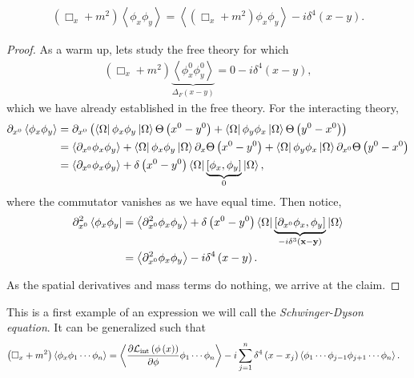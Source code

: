 \begin{claim}
    \begin{align}
        \left( \Box_x + m^2 \right) \left<\phi_x \phi_y \right> = \left< \left( \Box_x + m^2 \right) \phi_x \phi_y \right> - i \delta^{4} \left(  x- y \right) 
    .\end{align}
\end{claim}

\begin{proof}
    As a warm up, lets study the free theory for which
    \begin{align}
        \left( \Box_x + m^2 \right) \underbrace{\left<\phi_x^{0} \phi_y^{0} \right>}_{\Delta_F \left( x- y \right) } = 0 - i \delta^{4}\left( x-y \right) 
    ,\end{align}
    which we have already established in the free theory. For the interacting theory,
    \begin{align}
        \partial_{x^0} \left< \phi_x \phi_y \right> &= \partial_{x^0} \left( \bra{\Omega} \phi_x \phi_y \ket{\Omega} \Theta \left( x^{0} - y^{0} \right) + \bra{\Omega} \phi_y \phi_x \ket{\Omega} \Theta \left( y^{0} - x^{0} \right)  \right)  \\
        &= \left<\partial_{x^{0}} \phi_x \phi_y \right> + \bra{\Omega} \phi_x \phi_y \ket{\Omega} \partial_x \Theta \left( x^{0} - y^{0} \right)  + \bra{\Omega} \phi_y \phi_x \ket{\Omega} \partial_{x^{0}} \Theta \left( y^{0} - x^{0} \right)  \\
        &= \left< \partial_{x^{0}} \phi_x \phi_y \right> + \delta \left( x^{0} - y^{0} \right) \bra{\Omega} \underbrace{\left[ \phi_x, \phi_y \right]}_{0} \ket{\Omega}
    ,\end{align}
    where the commutator vanishes as we have equal time.
    Then notice,
    \begin{align}
        \partial_{x^{0}}^2 \bra{\phi_x \phi_y} &= \left<\partial_{x^{0}}^2 \phi_x \phi_y \right> + \delta \left( x^{0} - y^{0} \right) \bra{\Omega} \underbrace{\left[ \partial_{x^{0}} \phi_x , \phi_y \right]}_{-i \delta^{3}\left( \vb{x} - \vb{y} \right) } \ket{\Omega} \\
        &= \left<\partial_{x^{0}}^2 \phi_x \phi_y \right> - i \delta^{4} \left( x -y \right) 
    .\end{align}

    As the spatial derivatives and mass terms do nothing, we arrive at the claim.
\end{proof}

This is a first example of an expression we will call the \textit{Schwinger-Dyson equation}. It can be generalized such that
\begin{align} \label{eq:schwinger_dyson}
    \left( \Box_x + m^2 \right) \left<\phi_x \phi_1 \cdots \phi_n \right> &= \left< \pdv{\mathcal{L}_{\text{int}}\left( \phi \left( x \right) \right)}{\phi}   \phi_1 \cdots \phi_n \right> - i \sum_{j=1}^{n}  \delta^{4} \left( x - x_j \right) \left<\phi_1 \cdots \phi_{j-1} \phi_{j+1} \cdots \phi_n \right>
.\end{align}

